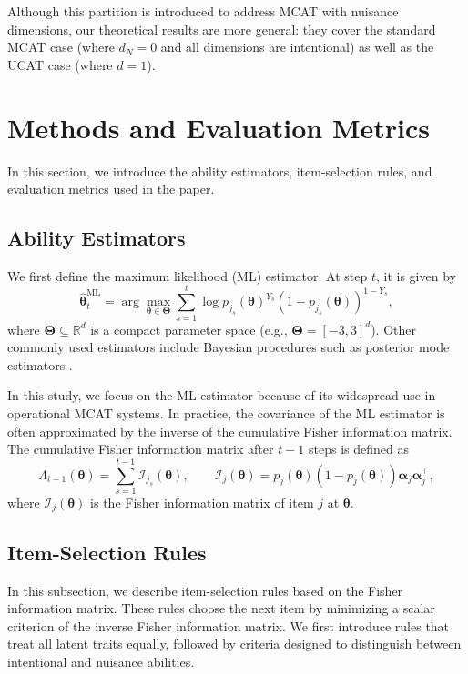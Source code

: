\documentclass[12pt]{article}
\newcommand{\bfTheta}{\boldsymbol{\Theta}}
\newcommand{\bfalpha}{\boldsymbol{\alpha}}
\newcommand{\bftheta}{\boldsymbol{\theta}}
\begin{document}
Although this partition is introduced to address MCAT with nuisance dimensions, our theoretical results are more general: they cover the standard MCAT case (where $d_N=0$ and all dimensions are intentional) as well as the UCAT case (where $d=1$).


\section{Methods and Evaluation Metrics} \label{sec:methods}
In this section, we introduce the ability estimators, item-selection rules, and evaluation metrics used in the paper.

\subsection{Ability Estimators}
We first define the maximum likelihood (ML) estimator. At step $t$, it is given by
\begin{equation*}
\hat{\bftheta}_t^{\mathrm{ML}}=\arg\max_{\bftheta \in \bfTheta} \sum_{s=1}^t\log p_{j_s}(\bftheta)^{Y_s}(1-p_{j_s}(\bftheta))^{1-Y_s},
\end{equation*}
where $\bfTheta \subseteq \mathbb{R}^d$ is a compact parameter space (e.g., $\bfTheta = [-3,3]^d$). Other commonly used estimators include Bayesian procedures such as posterior mode estimators \cite{segall1996multidimensional, segall2009principles}.

In this study, we focus on the ML estimator because of its widespread use in operational MCAT systems. In practice, the covariance of the ML estimator is often approximated by the inverse of the cumulative Fisher information matrix.
The cumulative Fisher information matrix after $t-1$ steps is defined as 
\begin{equation} \label{e:cumulative_fisher}
\Lambda_{t-1}( \bftheta )=\sum_{s=1}^{t-1} \mathcal{I}_{j_s}(\bftheta), 
\qquad \mathcal{I}_j(\bftheta)=p_j(\bftheta)(1-p_j(\bftheta))\bfalpha_j\bfalpha_j^\top,
\end{equation}
where $\mathcal{I}_j(\bftheta)$ is the Fisher information matrix of item $j$ at $\bftheta$.




\subsection{Item-Selection Rules} \label{sub:itemselection}
In this subsection, we describe item-selection rules based on the Fisher information matrix. These rules choose the next item by minimizing a scalar criterion of the inverse Fisher information matrix. We first introduce rules that treat all latent traits equally, followed by criteria designed to distinguish between intentional and nuisance abilities.
\end{document}
